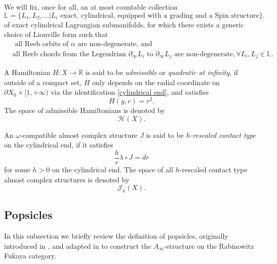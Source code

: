 \documentclass[11pt]{amsproc}
\def\R{{\mathbb R}}
\def\L{{\mathbb L}}
\def\ainf{A_\infty}
\def\p{\partial}
\theoremstyle{remark}
\numberwithin{equation}{section}
\begin{document}
We will fix, once for all, an at most countable collection 
\begin{equation}\label{collection of objects}
\L = \{L_{1}, L_{2}, \ldots | L_{i} \text{ exact, cylindrical, equipped with a grading and a Spin structure}\}.
\end{equation}
 of exact cylindrical Lagrangian submanifolds, 
 for which there exists a generic choice of Liouville form such that
\begin{equation}\label{non-degenerate Reeb dynamics}
\begin{split}
& \text{ all Reeb orbits of } \alpha \text{ are non-degenerate, and } \\
 &\text{all Reeb chords from the Legendrian } \p_{\infty}L_{i} \text{ to } \p_{\infty}L_{j} \text{ are non-degenerate}, \forall L_{i}, L_{j} \in \L.
\end{split}
\end{equation}

A Hamiltonian $H: X \to \R$ is said to be {\it admissible} or {\it quadratic at infinity},
if outside of a compact set, $H$ only depends on the radial coordinate on $\p X_{0} \times [1, +\infty)$ via the identification \eqref{cylindrical end},
and satisfies 
\begin{equation}
H(y, r) = r^{2}.
\end{equation}
The space of admissible Hamiltonians is denoted by 
\begin{equation}
\mathcal{H}(X).
\end{equation}

An $\omega$-compatible almost complex structure $J$ is said to be {\it $h$-rescaled contact type} on the cylindrical end,
if it satisfies 
\begin{equation}
\label{h rescaled contact type}
\frac{h}{r} \lambda \circ J = dr
\end{equation}
for some $h>0$ on the cylindrical end.
The space of all $h$-rescaled contact type almost complex structures is denoted by
\begin{equation}
\mathcal{J}_{h}(X).
\end{equation}

\subsection{Popsicles}\label{section: popsicles}

In this subsection we briefly review the definition of popsicles, 
originally introduced in \cite{abouzaid-seidel},
and adapted in \cite{GGV} to construct the $\ainf$-structure on the Rabinowitz Fukaya category.
\end{document}
